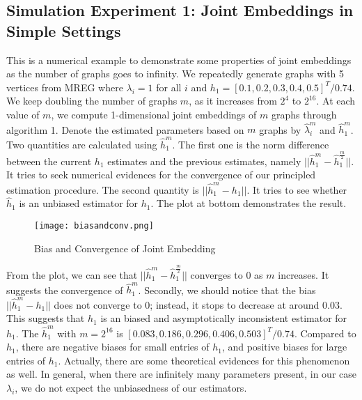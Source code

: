 \documentclass[10pt,journal,compsoc]{IEEEtran}
\begin{document}
\subsection{Simulation Experiment 1: Joint Embeddings in Simple Settings}
\noindent This is a numerical example to demonstrate some properties of joint embeddings as the number of graphs goes to infinity. We repeatedly generate graphs with 5 vertices from MREG where $\lambda_i=1$ for all $i$ and $h_1=[0.1,0.2,0.3,0.4,0.5]^T/0.74$. We keep doubling the number of graphs $m$, as it increases from $2^4$ to $2^{16}$. At each value of $m$, we compute 1-dimensional joint embeddings of $m$ graphs through algorithm 1. Denote the estimated parameters based on $m$ graphs by $\hat{\lambda}_i^m$ and $\hat{h}_1^m$. Two quantities are calculated using $\hat{h}_1^m$. The first one is the norm difference between the current $h_1$ estimates and the previous estimates, namely $||\hat{h}_1^m-\hat{h}_1^{\frac{m}{2}}||$. It tries to seek numerical evidences for the convergence of our principled estimation procedure. The second quantity is $||\hat{h}^m_1-h_1||$. It tries to see whether $\hat{h}_1$ is an unbiased estimator for $h_1$. The plot at bottom demonstrates the result. \\

\begin{figure}[!htbp]
	\centering
	\texttt{[image: biasandconv.png]}
	\caption{Bias and Convergence of Joint Embedding}
\end{figure}

\noindent From the plot, we can see that  $||\hat{h}_1^m-\hat{h}_1^{\frac{m}{2}}||$ converges to $0$ as $m$ increases. It suggests the convergence of $\hat{h}_1^m$. Secondly, we should notice that the bias $||\hat{h}^m_1-h_1||$ does not converge to $0$; instead, it stops to decrease at around $0.03$. This suggests that $\hat{h}_1$ is an biased and asymptotically inconsistent estimator for $h_1$. The $\hat{h}_1^m$ with $m=2^{16}$ is $[0.083,0.186, 0.296, 0.406, 0.503]^T/0.74$. Compared to $h_1$, there are negative biases for small entries of $h_1$, and positive biases for large entries of $h_1$. Actually, there are some theoretical evidences for this phenomenon as well. In general, when there are infinitely many parameters present, in our case $\lambda_i$, we do not expect the unbiasedness of our estimators. \\
\end{document}
